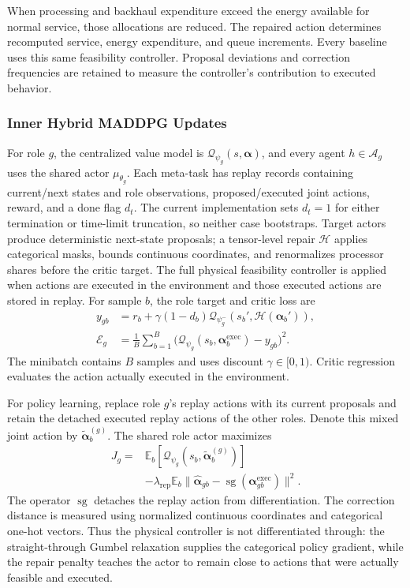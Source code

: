 \documentclass[journal]{IEEEtran}
\begin{document}
When processing and backhaul expenditure exceed the energy available for normal service, those allocations are reduced. The repaired action determines recomputed service, energy expenditure, and queue increments. Every baseline uses this same feasibility controller. Proposal deviations and correction frequencies are retained to measure the controller's contribution to executed behavior.

\subsubsection{Inner Hybrid MADDPG Updates}
For role $g$, the centralized value model is $\mathcal Q_{\psi_g}(s,\boldsymbol\alpha)$, and every agent $h\in\mathcal A_g$ uses the shared actor $\mu_{\theta_g}$. Each meta-task has replay records containing current/next states and role observations, proposed/executed joint actions, reward, and a done flag $d_t$. The current implementation sets $d_t=1$ for either termination or time-limit truncation, so neither case bootstraps. Target actors produce deterministic next-state proposals; a tensor-level repair $\mathscr H$ applies categorical masks, bounds continuous coordinates, and renormalizes processor shares before the critic target. The full physical feasibility controller is applied when actions are executed in the environment and those executed actions are stored in replay. For sample $b$, the role target and critic loss are
\begin{align}
y_{gb}&=r_b+\gamma(1-d_b)
 \mathcal Q_{\psi_g^-}(s_b',\mathscr H(\boldsymbol\alpha_b')),\\
\mathcal E_g&=\frac1{B}\sum_{b=1}^{B}
 \bigl(\mathcal Q_{\psi_g}(s_b,\boldsymbol\alpha_b^{\mathrm{exec}})-y_{gb}\bigr)^2.
\label{eq:critic}
\end{align}
The minibatch contains $B$ samples and uses discount $\gamma\in[0,1)$. Critic regression evaluates the action actually executed in the environment.

For policy learning, replace role $g$'s replay actions with its current proposals and retain the detached executed replay actions of the other roles. Denote this mixed joint action by $\widetilde{\boldsymbol\alpha}_b^{(g)}$. The shared role actor maximizes
\begin{equation}
\begin{aligned}
J_g={}&\mathbb E_b[\mathcal Q_{\psi_g}(s_b,
 \widetilde{\boldsymbol\alpha}_b^{(g)})]\\
&-\lambda_{\mathrm{rep}}\mathbb E_b
 \|\widehat{\boldsymbol\alpha}_{gb}
 -\operatorname{sg}(\boldsymbol\alpha_{gb}^{\mathrm{exec}})\|^2.
\end{aligned}
\label{eq:actor}
\end{equation}
The operator $\operatorname{sg}$ detaches the replay action from differentiation. The correction distance is measured using normalized continuous coordinates and categorical one-hot vectors. Thus the physical controller is not differentiated through: the straight-through Gumbel relaxation supplies the categorical policy gradient, while the repair penalty teaches the actor to remain close to actions that were actually feasible and executed.
\end{document}
